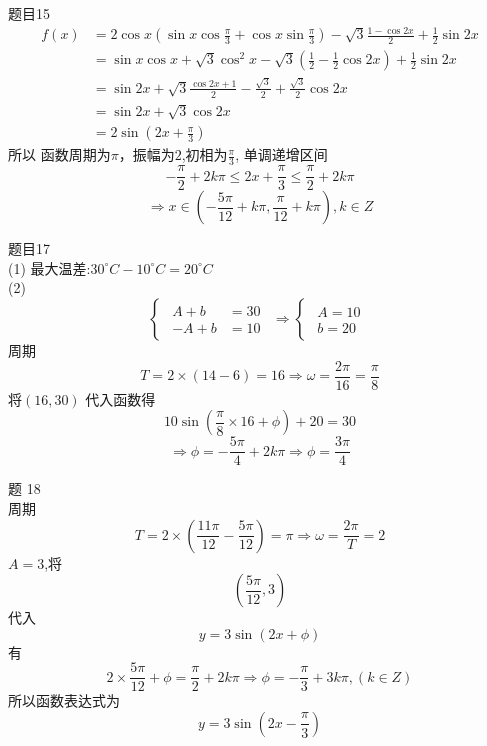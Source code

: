 \documentclass{article}
\begin{document}
\noindent 
题目15
\begin{equation*}
\begin{split}
f(x)&=2\cos{x} (\sin{x}\cos{\frac{\pi}{3}}+\cos{x}\sin{\frac{\pi}{3}}) -\sqrt{3} \frac{1-\cos{2x}}{2}+\frac{1}{2}\sin{2x} \\
&=\sin{x}\cos{x}+\sqrt{3}\cos^2{x}-\sqrt{3}(\frac{1}{2}-\frac{1}{2}\cos{2x}) +\frac{1}{2}\sin{2x} \\
&= \sin{2x}+\sqrt{3}\frac{\cos{2x}+1}{2} -\frac{\sqrt{3}}{2}+
\frac{\sqrt{3}}{2}\cos{2x}\\
&= \sin{2x} +\sqrt{3}\cos{2x} \\
&= 2\sin{(2x+\frac{\pi}{3})}
\end{split}
\end{equation*}
所以 函数周期为$\pi$，振幅为$2$,初相为$\frac{\pi}{3}$,
单调递增区间 $$-\frac{\pi}{2}+2k\pi \le 2x+\frac{\pi}{3}\le \frac{\pi}{2}+2k\pi$$$$\Longrightarrow x\in (-\frac{5\pi}{12}+k\pi,\frac{\pi}{12}+k\pi),k\in Z$$

题目17 \\
(1) 最大温差:$30^{\circ}C -10^{\circ}C=20^{\circ}C$\\ 
(2) 
\begin{equation*}
\begin{cases}
\begin{split}
A+b&=30 \\
-A+b&=10 
\end{split}
\end{cases}
\Longrightarrow 
\begin{cases}
\begin{split}
A=10 \\
b=20
\end{split}
\end{cases}
\end{equation*}
周期$$T=2\times(14-6)=16\Longrightarrow \omega=\frac{2\pi}{16}=\frac{\pi}{8}$$
将$(16,30)$ 代入函数得$$10\sin{(\frac{\pi}{8}\times 16+\phi)}+20=30$$ $$\Longrightarrow \phi=-\frac{5\pi}{4}+2k\pi \Longrightarrow 
\phi=\frac{3\pi}{4}$$

题 18\\
周期$$T=2\times(\frac{11\pi}{12}-\frac{5\pi}{12})=\pi \Longrightarrow \omega=\frac{2\pi}{T}=2$$ 
$A=3$,将$$(\frac{5\pi}{12},3)$$代入$$y=3\sin{(2x+\phi)}$$有
\[2\times \frac{5\pi}{12}+\phi=\frac{\pi}{2}+2k\pi \Longrightarrow \phi=-\frac{\pi}{3}+3k\pi,(k\in Z)\] 
所以函数表达式为\[y=3\sin{(2x-\frac{\pi}{3})}\]
\end{document}
